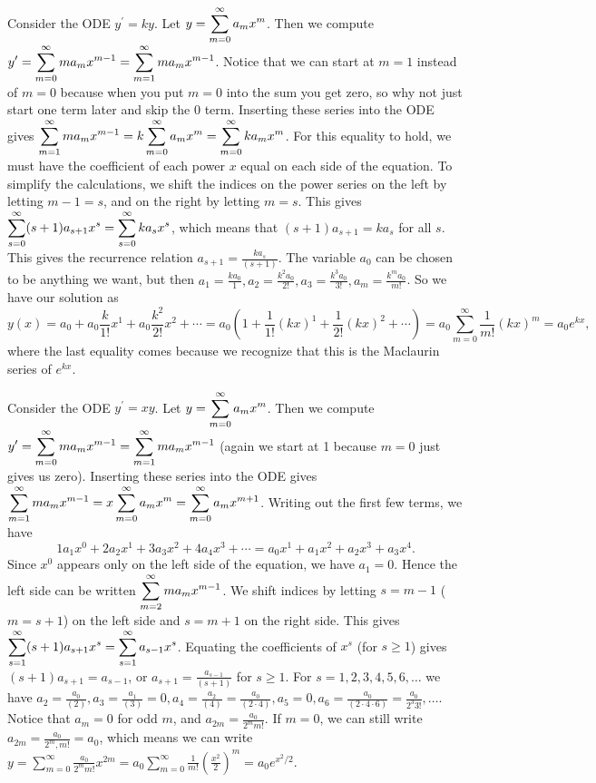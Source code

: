 Consider the ODE $y^\prime=ky$.  Let $\displaystyle y=\sum_{m=0}^\infty a_m x^m$.  Then we compute
$\displaystyle y^\prime 
= \sum_{m=0}^\infty m a_m x^{m-1} 
= \sum_{m=1}^\infty m a_m x^{m-1} 
$. Notice that we can start at $m=1$ instead of $m=0$ because when you put $m=0$ into the sum you get zero, so why not just start one term later and skip the 0 term.
Inserting these series into the ODE gives 
$\displaystyle \sum_{m=1}^\infty m a_m x^{m-1}=k\sum_{m=0}^\infty a_m x^m = \sum_{m=0}^\infty ka_m x^m$. For this equality to hold, we must have the coefficient of each power $x$ equal on each side of the equation.  To simplify the calculations, we shift the indices on the power series on the left by letting $m-1=s$, and on the right by letting $m=s$.  This gives $\displaystyle \sum_{s=0}^\infty (s+1) a_{s+1} x^{s}= \sum_{s=0}^\infty ka_s x^s$, which means that $(s+1) a_{s+1} = ka_s$ for all $s$.  This gives the recurrence relation $a_{s+1}=\frac{ka_s}{(s+1)}$.  The variable $a_0$ can be chosen to be anything we want, but then $a_1=\frac{ka_0}{1},a_2=\frac{k^2a_0}{2!},a_3=\frac{k^3a_0}{3!}, a_m=\frac{k^ma_0}{m!}$.  So we have our solution as $$y(x) = a_0+a_0\frac{k}{1!}x^1+a_0\frac{k^2}{2!}x^2+\cdots = a_0\left(1+\frac{1}{1!}(kx)^1 + \frac{1}{2!}(kx)^2+\cdots\right) = a_0 \sum_{m=0}^\infty \frac{1}{m!}(kx)^m= a_0 e^{kx},$$ where the last equality comes because we recognize that this is the Maclaurin series of $e^{kx}$.

Consider the ODE $y^\prime=xy$. Let $\displaystyle y=\sum_{m=0}^\infty a_m x^m$.  Then we compute
$\displaystyle y^\prime 
= \sum_{m=0}^\infty m a_m x^{m-1} 
= \sum_{m=1}^\infty m a_m x^{m-1} 
$ (again we start at 1 because $m=0$ just gives us zero).
Inserting these series into the ODE gives 
$\displaystyle \sum_{m=1}^\infty m a_m x^{m-1}=x\sum_{m=0}^\infty a_m x^m = \sum_{m=0}^\infty a_m x^{m+1}$.
Writing out the first few terms, we have $$1a_1x^0+2a_2x^1+3a_3x^2+4a_4x^3+\cdots = a_0x^1+a_1x^2+a_2x^3+a_3x^4.$$
Since $x^0$ appears only on the left side of the equation, we have $a_1=0$.  Hence the left side can be written $\displaystyle \sum_{m=2}^\infty m a_m x^{m-1}$. We shift indices by letting $s=m-1$ ($m=s+1$) on the left side and $s=m+1$ on the right side.  This gives 
$\displaystyle \sum_{s=1}^\infty (s+1) a_{s+1} x^{s}=\sum_{s=1}^\infty a_{s-1} x^{s}$. Equating the coefficients of $x^s$ (for $s\geq 1$) gives $(s+1) a_{s+1} = a_{s-1}$, or $a_{s+1} = \frac{a_{s-1}}{(s+1)}$ for $s\geq 1$.  For $s=1,2,3,4,5,6,\ldots$ we have $a_{2} = \frac{a_{0}}{(2)},a_{3} = \frac{a_{1}}{(3)}=0, a_{4} = \frac{a_{2}}{(4)} =\frac{a_{0}}{(2\cdot 4)}, a_5=0, a_6=\frac{a_{0}}{(2\cdot 4\cdot 6)} = \frac{a_{0}}{2^3 3!}, \ldots$.  Notice that $a_m=0$ for odd $m$, and $a_{2m}=\frac{a_{0}}{2^m m!}$.  If $m=0$, we can still write $a_{2m}=\frac{a_{0}}{2^m, m!}=a_0$, which means we can write $y=\sum_{m=0}^\infty \frac{a_{0}}{2^m m!}x^{2m} = a_0\sum_{m=0}^\infty \frac{1}{m!}\left(\frac{x^2}{2}\right)^{m} = a_0e^{x^2/2}$.


